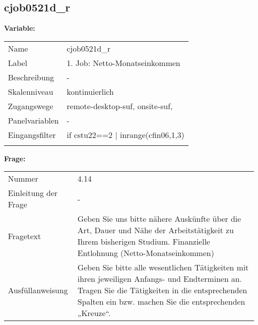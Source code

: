 	
	
	\subsection{cjob0521d\_r}
	\label{subSection:cjob0521d_r}

	\noindent\textbf{Variable:}\\
		\begin{tabular}{lL{11.3cm}}
			\label{tableVariable:cjob0521d_r}
			Name & cjob0521d\_r \\
			Label & 1. Job: Netto-Monatseinkommen \\
			Beschreibung & - \\
			Skalenniveau & kontinuierlich \\
			Zugangswege &
				remote-desktop-suf,
				onsite-suf,
 \\
			Panelvariablen & -
			 \\
			Eingangsfilter & if cstu22==2 | inrange(cfin06,1,3) \\
 \\
		\end{tabular}

		\vspace*{1 cm}
		\noindent\textbf{Frage:}\\
		\begin{tabular}{lL{11.3cm}}
			\label{tableQuestion:cjob0521d_r}
			Nummer & 4.14 \\
			Einleitung der Frage & - \\
			Fragetext & Geben Sie uns bitte nähere Auskünfte über die Art, Dauer und Nähe der Arbeitstätigkeit zu Ihrem bisherigen Studium.
Finanzielle Entlohnung
(Netto-Monatseinkommen) \\
			Ausfüllanweisung & Geben Sie bitte alle wesentlichen Tätigkeiten mit ihren jeweiligen Anfangs- und Endterminen an. Tragen Sie die Tätigkeiten in die entsprechenden Spalten ein bzw. machen Sie die entsprechenden „Kreuze“. \\
		\end{tabular}




